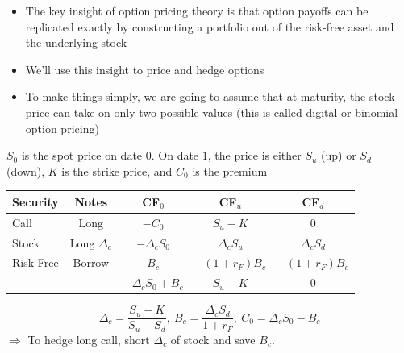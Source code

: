 \documentclass{beamer}
\begin{document}
\begin{frame}{}
	\begin{itemize}
		\item The key insight of option pricing theory is that option payoffs can be replicated exactly by constructing a portfolio out of the risk-free asset and the underlying stock
		\item We'll use this insight to price and hedge options
		\item To make things simply, we are going to assume that at maturity, the stock price can take on only two possible values (this is called digital or binomial option pricing)
	\end{itemize}
\end{frame}

\begin{frame}{}
	$S_{0}$ is the spot price on date $0$. On date $1$, the price is either $S_{u}$ (up) or $S_{d}$ (down), $K$ is the strike price, and $C_{0}$ is the premium
    \begin{center}
        \begin{tabular}{lcccc}
			Security & Notes & CF$_{0}$ & CF$_{u}$ & CF$_{d}$ \\ \hline\hline
			Call & Long & $-C_{0}$ & $S_{u}-K$ &$0$\\ \hline\hline
			Stock & Long $\Delta_{c}$  & $-\Delta_{c} S_{0}$ & $\Delta_{c} S_{u}$ & $\Delta_{c} S_{d}$ \\
			Risk-Free & Borrow & $B_{c}$ & $-(1+r_{F})B_{c}$ & $-(1+r_{F})B_{c}$\\ \hline
			& & $-\Delta_{c} S_{0}+B_{c}$ & $S_{u}-K$ & $0$ \\ \hline\hline
        \end{tabular}
    \end{center}
	\begin{equation}
		\boxed{\Delta_{c}=\frac{S_{u}-K}{S_{u}-S_{d}},\:B_{c}=\frac{\Delta_{c}S_{d}}{1+r_{F}},\:C_{0}=\Delta_{c}S_{0}-B_{c}}
	\end{equation}
	$\Rightarrow$ To hedge long call, short $\Delta_{c}$ of stock and save $B_{c}$.
\end{frame}

\begin{frame}{}
	
\end{frame}
\end{document}
